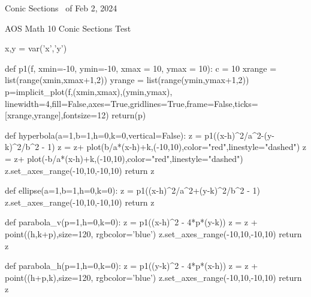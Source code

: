 \documentclass[10pt]{exam}
\begin{document}
\pagestyle{headandfoot}
\runningheadrule
{}
{Conic Sections \thepage\ of \numpages}
{Feb 2, 2024}

\noindent
{\Large AOS Math 10 Conic Sections Test}
\vspace{2ex}

\noindent
\vspace{5mm}

\noindent
\vspace{5mm}


\newcommand{\tf}[1][{}]{%
\fillin[#1][0.5in]%
}
\newcommand{\hyperbola}[4]{%
	$\dfrac{\sage{(x-#1)^2}}{\sage{#3^2}} - \dfrac{\sage{(y-#2)^2}}{\sage{#4^2}}$
}

\newcommand{\ellipse}[4]{%
	$\dfrac{\sage{(x-#1)^2}}{\sage{#3^2}} + \dfrac{\sage{(y-#2)^2}}{\sage{#4^2}}$
}

\newcommand{\parabola}[3]{%
	$\sage{(x-#1)^2}=\sage{4*#3}(\sage{(y-#2)})$
}

\begin{sagesilent}
	x,y = var('x','y')

	def p1(f, xmin=-10, ymin=-10, xmax = 10, ymax = 10):
		  c = 10
		  xrange = list(range(xmin,xmax+1,2))
		  yrange = list(range(ymin,ymax+1,2))
		  p=implicit_plot(f,(xmin,xmax),(ymin,ymax),
			linewidth=4,fill=False,axes=True,gridlines=True,frame=False,ticks=[xrange,yrange],fontsize=12)
		  return(p)

	def hyperbola(a=1,b=1,h=0,k=0,vertical=False):
		  z = p1((x-h)^2/a^2-(y-k)^2/b^2 - 1)
		  z = z+ plot(b/a*(x-h)+k,(-10,10),color="red",linestyle="dashed")
		  z = z+ plot(-b/a*(x-h)+k,(-10,10),color="red",linestyle="dashed")
		  z.set_axes_range(-10,10,-10,10)
		  return z

	def ellipse(a=1,b=1,h=0,k=0):
		  z = p1((x-h)^2/a^2+(y-k)^2/b^2 - 1)
		  z.set_axes_range(-10,10,-10,10)
		  return z

	def parabola_v(p=1,h=0,k=0):
		  z = p1((x-h)^2 - 4*p*(y-k))
		  z = z + point((h,k+p),size=120, rgbcolor='blue')
		  z.set_axes_range(-10,10,-10,10)
		  return z

	def parabola_h(p=1,h=0,k=0):
		  z = p1((y-k)^2 - 4*p*(x-h))
		  z = z + point((h+p,k),size=120, rgbcolor='blue')
		  z.set_axes_range(-10,10,-10,10)
		  return z
\end{sagesilent}
\end{document}
